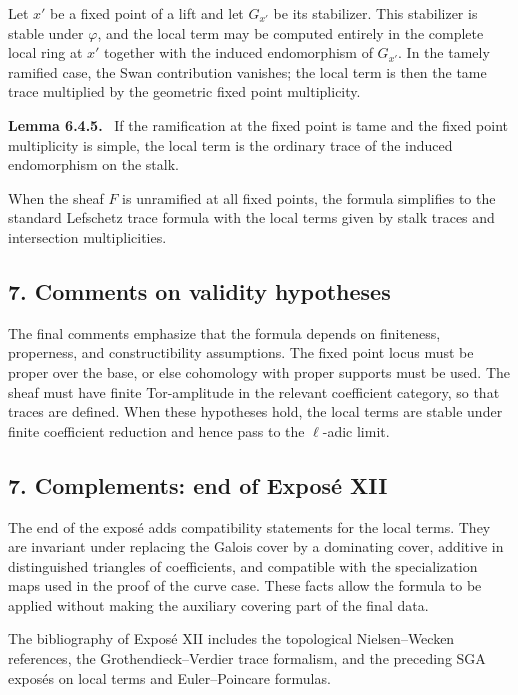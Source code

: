 \documentclass[11pt]{article}
\theoremstyle{plain}
\theoremstyle{definition}
\theoremstyle{remark}
\newenvironment{statement}[1]{\par\medskip\noindent\textbf{#1.}\ }{\par\medskip}
\begin{document}
Let $x'$ be a fixed point of a lift and let $G_{x'}$ be its stabilizer. This stabilizer is stable under $\varphi$, and the local term may be computed entirely in the complete local ring at $x'$ together with the induced endomorphism of $G_{x'}$. In the tamely ramified case, the Swan contribution vanishes; the local term is then the tame trace multiplied by the geometric fixed point multiplicity.

\begin{statement}{Lemma 6.4.5}
If the ramification at the fixed point is tame and the fixed point multiplicity is simple, the local term is the ordinary trace of the induced endomorphism on the stalk.
\end{statement}

When the sheaf $F$ is unramified at all fixed points, the formula simplifies to the standard Lefschetz trace formula with the local terms given by stalk traces and intersection multiplicities.

\subsection*{7. Comments on validity hypotheses}

The final comments emphasize that the formula depends on finiteness, properness, and constructibility assumptions. The fixed point locus must be proper over the base, or else cohomology with proper supports must be used. The sheaf must have finite Tor-amplitude in the relevant coefficient category, so that traces are defined. When these hypotheses hold, the local terms are stable under finite coefficient reduction and hence pass to the $\ell$-adic limit.

\subsection*{7. Complements: end of Expos\'e XII}

The end of the expos\'e adds compatibility statements for the local terms. They are invariant under replacing the Galois cover by a dominating cover, additive in distinguished triangles of coefficients, and compatible with the specialization maps used in the proof of the curve case. These facts allow the formula to be applied without making the auxiliary covering part of the final data.

The bibliography of Expos\'e XII includes the topological Nielsen--Wecken references, the Grothendieck--Verdier trace formalism, and the preceding SGA expos\'es on local terms and Euler--Poincare formulas.
\end{document}

